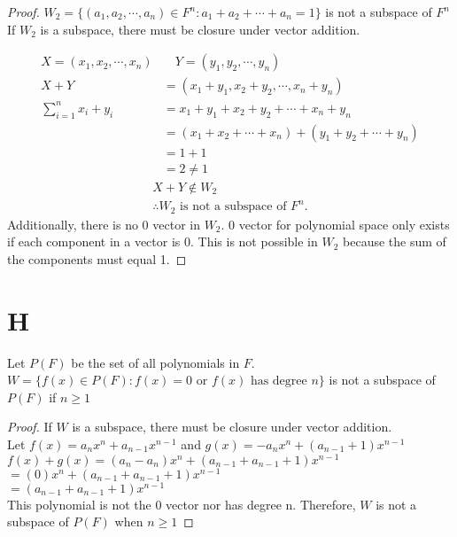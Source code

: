 \documentclass[11pt]{scrartcl}
\makeatletter
\newenvironment{Dequation}
  {%
  \def\tagform@##1{%
    \maketag@@@{\makebox[0pt][r]{(\ignorespaces##1\unskip\@@italiccorr)}}}%
  \ignorespaces
  }
  {%
  \def\tagform@##1{\maketag@@@{(\ignorespaces##1\unskip\@@italiccorr)}}%
  \ignorespacesafterend
  }
\makeatother
\begin{document}
\begin{proof}
$W_2 =\{(a_1, a_2,\cdots,a_n) \in F^n : a_1 + a_2 + \cdots + a_n= 1\}$ is not a subspace of $F^n$\\
If $W_2$ is a subspace, there must be closure under vector addition.
\begin{Dequation}
	\begin{align*}
			X = (x_1, x_2, \cdots, x_n) & \quad Y = (y_1, y_2, \cdots, y_n) \\
			X + Y & = (x_1 + y_1, x_2 + y_2, \cdots, x_n + y_n)\\
			\sum_{i = 1}^{n} x_i + y_i & = x_1 + y_1 + x_2 + y_2 + \cdots + x_n + y_n\\
			& = (x_1 + x_2 + \cdots + x_n) + (y_1 + y_2 + \cdots + y_n)\\
			& = 1 + 1 \\
			& = 2 \neq 1 
	\end{align*}
	\begin{gather*}
	X + Y \notin W_2 \\
	\therefore W_2 \text{ is not a subspace of $F^n$.}
	\end{gather*}
\end{Dequation}
Additionally, there is no 0 vector in $W_2$. 0 vector for polynomial space only exists if each component in a vector is 0. This is not possible in $W_2$ because the sum of the components must equal 1. 
\end{proof}

\section{H}
Let $P(F)$ be the set of all polynomials in $F$.\\
$W = \{f(x) \in P(F) : f(x) = 0 \text{ or } f(x) \text{ has degree } n\}$ is not a subspace of $P(F)$ if $n \geq 1$
\begin{proof}
If $W$ is a subspace, there must be closure under vector addition.\\
Let $f(x) = a_n x^n + a_{n-1} x^{n-1}$ and $g(x) = -a_n x^n + (a_{n-1} + 1) x^{n-1}$\\
$f(x) + g(x) = (a_n - a_n) x^n + (a_{n-1} + a_{n-1} + 1) x^{n-1} $ \\
$= (0) x^n + (a_{n-1} + a_{n-1} + 1) x^{n-1} $\\
$= (a_{n-1} + a_{n-1} + 1) x^{n-1}$\\
This polynomial is not the 0 vector nor has degree n. Therefore, $W$ is not a subspace of $P(F)$ when $n \geq 1$
\end{proof}
\end{document}
